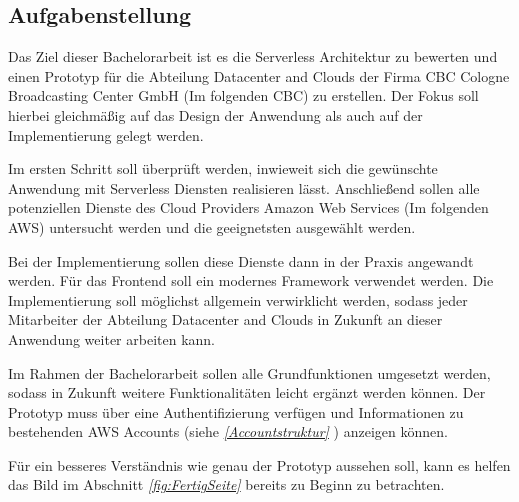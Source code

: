 \subsection{Aufgabenstellung}

Das Ziel dieser Bachelorarbeit ist es die Serverless Architektur zu bewerten und einen Prototyp für die Abteilung Datacenter and Clouds der Firma CBC Cologne Broadcasting Center GmbH (Im folgenden \glqq CBC\grqq) zu erstellen.
Der Fokus soll hierbei gleichmäßig auf das Design der Anwendung als auch auf der Implementierung gelegt werden.

Im ersten Schritt soll überprüft werden, inwieweit sich die gewünschte Anwendung mit Serverless Diensten realisieren lässt.
Anschließend sollen alle potenziellen Dienste des Cloud Providers Amazon Web Services (Im folgenden \glqq AWS\grqq) untersucht werden und die geeignetsten ausgewählt werden.

Bei der Implementierung sollen diese Dienste dann in der Praxis angewandt werden. Für das Frontend soll ein modernes Framework verwendet werden.
Die Implementierung soll möglichst allgemein verwirklicht werden, sodass jeder Mitarbeiter der Abteilung Datacenter and Clouds in Zukunft an dieser Anwendung weiter arbeiten kann.

Im Rahmen der Bachelorarbeit sollen alle Grundfunktionen umgesetzt werden, sodass in Zukunft weitere Funktionalitäten leicht ergänzt werden können.
Der Prototyp muss über eine Authentifizierung verfügen und Informationen zu bestehenden AWS Accounts (siehe \textit{\ref{Accountstruktur} }) anzeigen können.

Für ein besseres Verständnis wie genau der Prototyp aussehen soll, kann es helfen das Bild im Abschnitt \textit{\ref{fig:FertigSeite} } bereits zu Beginn zu betrachten.
